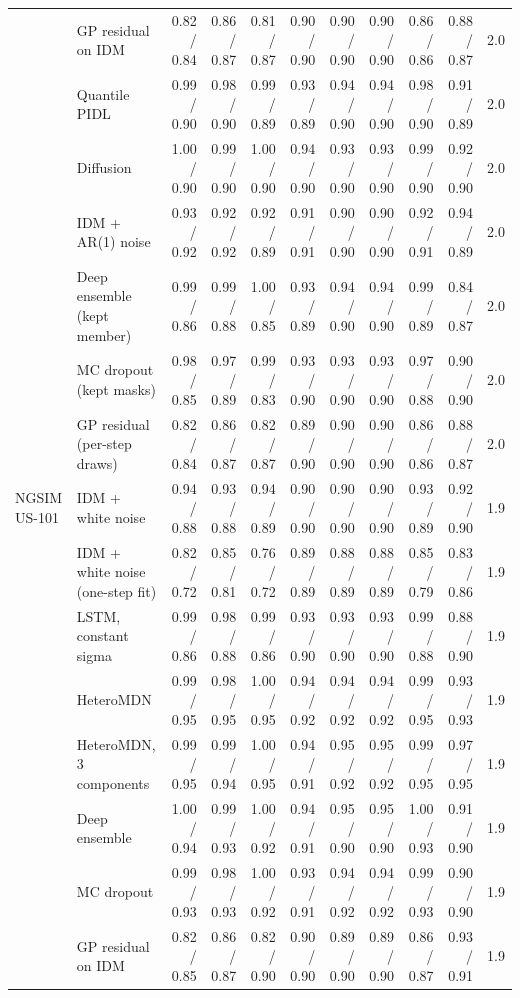 \begin{longtable}{llrrrrrrrrr}
 & GP residual on IDM & 0.82 / 0.84 & 0.86 / 0.87 & 0.81 / 0.87 & 0.90 / 0.90 & 0.90 / 0.90 & 0.90 / 0.90 & 0.86 / 0.86 & 0.88 / 0.87 & 2.0 \\
 & Quantile PIDL & 0.99 / 0.90 & 0.98 / 0.90 & 0.99 / 0.89 & 0.93 / 0.89 & 0.94 / 0.90 & 0.94 / 0.90 & 0.98 / 0.90 & 0.91 / 0.89 & 2.0 \\
 & Diffusion & 1.00 / 0.90 & 0.99 / 0.90 & 1.00 / 0.90 & 0.94 / 0.90 & 0.93 / 0.90 & 0.93 / 0.90 & 0.99 / 0.90 & 0.92 / 0.90 & 2.0 \\
 & IDM + AR(1) noise & 0.93 / 0.92 & 0.92 / 0.92 & 0.92 / 0.89 & 0.91 / 0.91 & 0.90 / 0.90 & 0.90 / 0.90 & 0.92 / 0.91 & 0.94 / 0.89 & 2.0 \\
 & Deep ensemble (kept member) & 0.99 / 0.86 & 0.99 / 0.88 & 1.00 / 0.85 & 0.93 / 0.89 & 0.94 / 0.90 & 0.94 / 0.90 & 0.99 / 0.89 & 0.84 / 0.87 & 2.0 \\
 & MC dropout (kept masks) & 0.98 / 0.85 & 0.97 / 0.89 & 0.99 / 0.83 & 0.93 / 0.90 & 0.93 / 0.90 & 0.93 / 0.90 & 0.97 / 0.88 & 0.90 / 0.90 & 2.0 \\
 & GP residual (per-step draws) & 0.82 / 0.84 & 0.86 / 0.87 & 0.82 / 0.87 & 0.89 / 0.90 & 0.90 / 0.90 & 0.90 / 0.90 & 0.86 / 0.86 & 0.88 / 0.87 & 2.0 \\
\midrule
NGSIM US-101 & IDM + white noise & 0.94 / 0.88 & 0.93 / 0.88 & 0.94 / 0.89 & 0.90 / 0.90 & 0.90 / 0.90 & 0.90 / 0.90 & 0.93 / 0.89 & 0.92 / 0.90 & 1.9 \\
 & IDM + white noise (one-step fit) & 0.82 / 0.72 & 0.85 / 0.81 & 0.76 / 0.72 & 0.89 / 0.89 & 0.88 / 0.89 & 0.88 / 0.89 & 0.85 / 0.79 & 0.83 / 0.86 & 1.9 \\
 & LSTM, constant sigma & 0.99 / 0.86 & 0.98 / 0.88 & 0.99 / 0.86 & 0.93 / 0.90 & 0.93 / 0.90 & 0.93 / 0.90 & 0.99 / 0.88 & 0.88 / 0.90 & 1.9 \\
 & HeteroMDN & 0.99 / 0.95 & 0.98 / 0.95 & 1.00 / 0.95 & 0.94 / 0.92 & 0.94 / 0.92 & 0.94 / 0.92 & 0.99 / 0.95 & 0.93 / 0.93 & 1.9 \\
 & HeteroMDN, 3 components & 0.99 / 0.95 & 0.99 / 0.94 & 1.00 / 0.95 & 0.94 / 0.91 & 0.95 / 0.92 & 0.95 / 0.92 & 0.99 / 0.95 & 0.97 / 0.95 & 1.9 \\
 & Deep ensemble & 1.00 / 0.94 & 0.99 / 0.93 & 1.00 / 0.92 & 0.94 / 0.91 & 0.95 / 0.90 & 0.95 / 0.90 & 1.00 / 0.93 & 0.91 / 0.90 & 1.9 \\
 & MC dropout & 0.99 / 0.93 & 0.98 / 0.93 & 1.00 / 0.92 & 0.93 / 0.91 & 0.94 / 0.92 & 0.94 / 0.92 & 0.99 / 0.93 & 0.90 / 0.90 & 1.9 \\
 & GP residual on IDM & 0.82 / 0.85 & 0.86 / 0.87 & 0.82 / 0.90 & 0.90 / 0.90 & 0.89 / 0.90 & 0.89 / 0.90 & 0.86 / 0.87 & 0.93 / 0.91 & 1.9 \\

\end{longtable}
